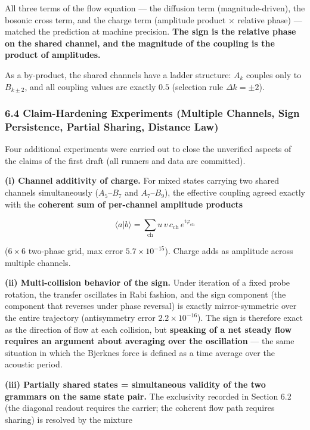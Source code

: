 \documentclass[
  a4paper,
]{article}
\begin{document}
All three terms of the flow equation --- the diffusion term
(magnitude-driven), the bosonic cross term, and the charge term
(amplitude product × relative phase) --- matched the prediction at
machine precision. \textbf{The sign is the relative phase on the shared
channel, and the magnitude of the coupling is the product of
amplitudes.}

As a by-product, the shared channels have a ladder structure: \(A_k\)
couples only to \(B_{k\pm2}\), and all coupling values are exactly
\(0.5\) (selection rule \(\Delta k=\pm2\)).

\subsubsection{6.4 Claim-Hardening Experiments (Multiple Channels, Sign
Persistence, Partial Sharing, Distance
Law)}\label{claim-hardening-experiments-multiple-channels-sign-persistence-partial-sharing-distance-law}

Four additional experiments were carried out to close the unverified
aspects of the claims of the first draft (all runners and data are
committed).

\textbf{(i) Channel additivity of charge.} For mixed states carrying two
shared channels simultaneously (\(A_5\)--\(B_7\) and \(A_7\)--\(B_9\)),
the effective coupling agreed exactly with the \textbf{coherent sum of
per-channel amplitude products}

\[
\langle a|b\rangle=\sum_{\text{ch}}u\,v\,c_{\text{ch}}\,e^{i\varphi_{\text{ch}}}
\]

(\(6\times6\) two-phase grid, max error \(5.7\times10^{-15}\)). Charge
adds as amplitude across multiple channels.

\textbf{(ii) Multi-collision behavior of the sign.} Under iteration of a
fixed probe rotation, the transfer oscillates in Rabi fashion, and the
sign component (the component that reverses under phase reversal) is
exactly mirror-symmetric over the entire trajectory (antisymmetry error
\(2.2\times10^{-16}\)). The sign is therefore exact as the direction of
flow at each collision, but \textbf{speaking of a net steady flow
requires an argument about averaging over the oscillation} --- the same
situation in which the Bjerknes force is defined as a time average over
the acoustic period.

\textbf{(iii) Partially shared states = simultaneous validity of the two
grammars on the same state pair.} The exclusivity recorded in Section
6.2 (the diagonal readout requires the carrier; the coherent flow path
requires sharing) is resolved by the mixture
\end{document}
